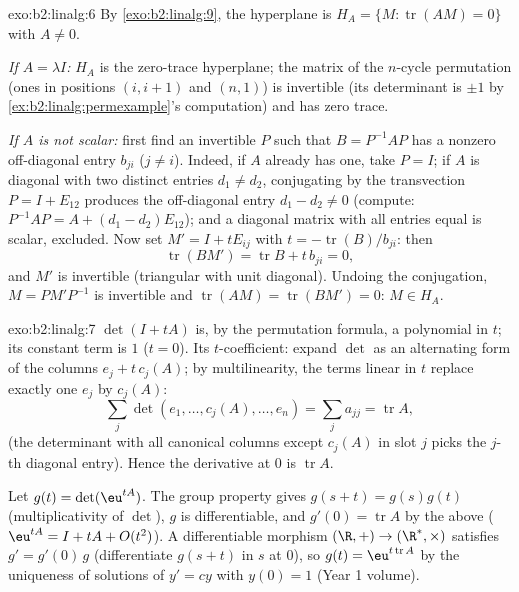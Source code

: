 \begin{solution}{exo:b2:linalg:6}
By \cref{exo:b2:linalg:9}, the hyperplane is $H_A = \{M :
\operatorname{tr}(AM) = 0\}$ with $A \neq 0$.

\emph{If $A = \lambda I$:} $H_A$ is the zero-trace hyperplane; the
matrix of the $n$-cycle permutation (ones in positions $(i, i+1)$
and $(n, 1)$) is invertible (its determinant is $\pm 1$ by
\cref{ex:b2:linalg:permexample}'s computation) and has zero trace.

\emph{If $A$ is not scalar:} first find an invertible $P$ such that
$B = P^{-1}AP$ has a nonzero off-diagonal entry $b_{ji}$ ($j \neq
i$). Indeed, if $A$ already has one, take $P = I$; if $A$ is
diagonal with two distinct entries $d_1 \neq d_2$, conjugating by
the transvection $P = I + E_{12}$ produces the off-diagonal entry
$d_1 - d_2 \neq 0$ (compute: $P^{-1}AP = A + (d_1 - d_2)E_{12}$);
and a diagonal matrix with all entries equal is
scalar, excluded. Now set $M' = I + tE_{ij}$ with $t =
-\operatorname{tr}(B)/b_{ji}$: then
\[
\operatorname{tr}(BM') = \operatorname{tr} B + t\,b_{ji} = 0,
\]
and $M'$ is invertible (triangular with unit diagonal). Undoing the
conjugation, $M = PM'P^{-1}$ is invertible and
$\operatorname{tr}(AM) = \operatorname{tr}(BM') = 0$: $M \in H_A$.
\end{solution}

\begin{solution}{exo:b2:linalg:7}
$\det(I + tA)$ is, by the permutation formula, a polynomial in $t$;
its constant term is $1$ ($t = 0$). Its $t$-coefficient: expand
$\det$ as an alternating form of the columns $e_j + t\,c_j(A)$; by
multilinearity, the terms linear in $t$ replace exactly one $e_j$ by
$c_j(A)$:
\[
\sum_{j} \det(e_1, \dots, c_j(A), \dots, e_n)
= \sum_j a_{jj} = \operatorname{tr} A ,
\]
(the determinant with all canonical columns except $c_j(A)$ in slot
$j$ picks the $j$-th diagonal entry). Hence the derivative at $0$ is
$\operatorname{tr} A$.

Let $g(t) = \det(\eu^{tA})$. The group property gives $g(s + t) =
g(s)g(t)$ (multiplicativity of $\det$), $g$ is differentiable, and
$g'(0) = \operatorname{tr} A$ by the above ($\eu^{tA} = I + tA +
O(t^2)$). A differentiable morphism $(\R, +) \to (\R^*, \times)$
satisfies $g' = g'(0)\,g$ (differentiate $g(s+t)$ in $s$ at $0$), so
$g(t) = \eu^{t\operatorname{tr} A}$ by the uniqueness of solutions
of $y' = cy$ with $y(0) = 1$ (Year 1 volume).
\end{solution}

